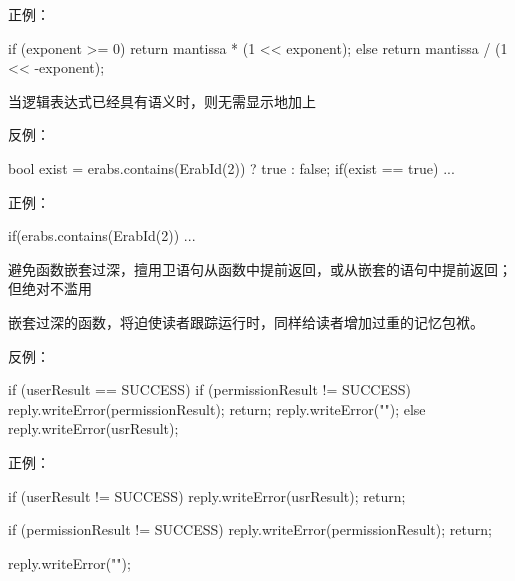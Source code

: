 \begin{content}
正例：
\begin{leftbar}
\begin{c++}
if (exponent >= 0)
{
    return mantissa * (1 << exponent);
}
else
{
    return mantissa / (1 << -exponent);
}
\end{c++}
\end{leftbar}

\begin{regulation}
当逻辑表达式已经具有语义时，则无需显示地加上
\end{regulation}

反例：
\begin{leftbar}
\begin{c++}
bool exist = erabs.contains(ErabId(2)) ? true : false;
if(exist == true)
{
    ...
}
\end{c++}
\end{leftbar}

正例：
\begin{leftbar}
\begin{c++}
if(erabs.contains(ErabId(2))
{
    ...
}
\end{c++}
\end{leftbar}

\begin{regulation}
避免函数嵌套过深，擅用卫语句从函数中提前返回，或从嵌套的语句中提前返回；但绝对不滥用
\end{regulation}

嵌套过深的函数，将迫使读者跟踪运行时，同样给读者增加过重的记忆包袱。

反例：
\begin{leftbar}
\begin{c++}
if (userResult == SUCCESS)
{
    if (permissionResult != SUCCESS)
    {
        reply.writeError(permissionResult);
        return;
    }
    reply.writeError("");
}
else
{
    reply.writeError(usrResult);
}
\end{c++}
\end{leftbar}

正例：
\begin{leftbar}
\begin{c++}
if (userResult != SUCCESS)
{
    reply.writeError(usrResult);
    return;
}

if (permissionResult != SUCCESS)
{
    reply.writeError(permissionResult);
    return;
}

reply.writeError("");

\end{c++}
\end{leftbar}


\end{content}
